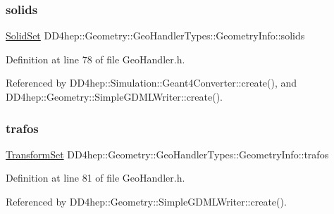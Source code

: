 \subsubsection{\texorpdfstring{solids}{solids}}
{\footnotesize\ttfamily \hyperlink{class_d_d4hep_1_1_geometry_1_1_geo_handler_types_a85d065cdf670a4f9ea9c0c4dee921fce}{Solid\+Set} D\+D4hep\+::\+Geometry\+::\+Geo\+Handler\+Types\+::\+Geometry\+Info\+::solids}



Definition at line 78 of file Geo\+Handler.\+h.



Referenced by D\+D4hep\+::\+Simulation\+::\+Geant4\+Converter\+::create(), and D\+D4hep\+::\+Geometry\+::\+Simple\+G\+D\+M\+L\+Writer\+::create().

\hypertarget{class_d_d4hep_1_1_geometry_1_1_geo_handler_types_1_1_geometry_info_a51f3a3d4173ce95231772c575b18cd8d}{}\label{class_d_d4hep_1_1_geometry_1_1_geo_handler_types_1_1_geometry_info_a51f3a3d4173ce95231772c575b18cd8d} 
\subsubsection{\texorpdfstring{trafos}{trafos}}
{\footnotesize\ttfamily \hyperlink{class_d_d4hep_1_1_geometry_1_1_geo_handler_types_aa52b3113e87db04c37666e85a9b5e569}{Transform\+Set} D\+D4hep\+::\+Geometry\+::\+Geo\+Handler\+Types\+::\+Geometry\+Info\+::trafos}



Definition at line 81 of file Geo\+Handler.\+h.



Referenced by D\+D4hep\+::\+Geometry\+::\+Simple\+G\+D\+M\+L\+Writer\+::create().

\hypertarget{class_d_d4hep_1_1_geometry_1_1_geo_handler_types_1_1_geometry_info_ac11f2e847e838a2b6a60f2f8d0f9a64c}{}\label{class_d_d4hep_1_1_geometry_1_1_geo_handler_types_1_1_geometry_info_ac11f2e847e838a2b6a60f2f8d0f9a64c} 
